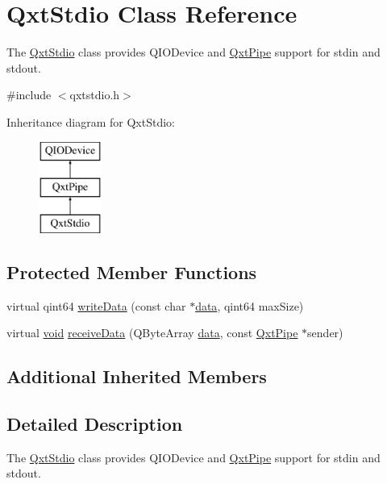 \hypertarget{class_qxt_stdio}{\section{Qxt\-Stdio Class Reference}
\label{class_qxt_stdio}
}


The \hyperlink{class_qxt_stdio}{Qxt\-Stdio} class provides Q\-I\-O\-Device and \hyperlink{class_qxt_pipe}{Qxt\-Pipe} support for stdin and stdout.  




{\ttfamily \#include $<$qxtstdio.\-h$>$}

Inheritance diagram for Qxt\-Stdio\-:\begin{figure}[H]
\begin{center}
\leavevmode
\includegraphics[height=3.000000cm]{class_qxt_stdio}
\end{center}
\end{figure}
\subsection*{Protected Member Functions}
\begin{DoxyCompactItemize}
\item 
virtual qint64 \hyperlink{class_qxt_stdio_a4eb0284bd569ece883b96bb53adbc3ba}{write\-Data} (const char $\ast$\hyperlink{glext_8h_a8850df0785e6fbcc2351af3b686b8c7a}{data}, qint64 max\-Size)
\item 
virtual \hyperlink{group___u_a_v_objects_plugin_ga444cf2ff3f0ecbe028adce838d373f5c}{void} \hyperlink{class_qxt_stdio_ac4616502aa395840818bd0e6e89582de}{receive\-Data} (Q\-Byte\-Array \hyperlink{glext_8h_a8850df0785e6fbcc2351af3b686b8c7a}{data}, const \hyperlink{class_qxt_pipe}{Qxt\-Pipe} $\ast$sender)
\end{DoxyCompactItemize}
\subsection*{Additional Inherited Members}


\subsection{Detailed Description}
The \hyperlink{class_qxt_stdio}{Qxt\-Stdio} class provides Q\-I\-O\-Device and \hyperlink{class_qxt_pipe}{Qxt\-Pipe} support for stdin and stdout. 

